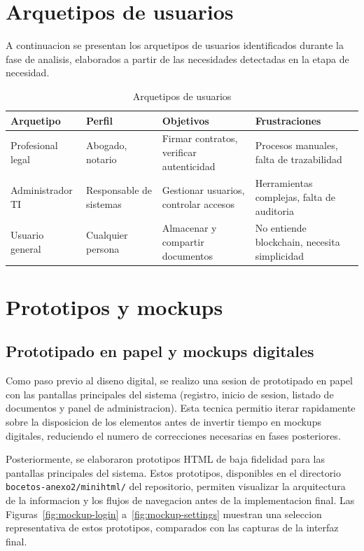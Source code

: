 \documentclass[11pt, a4paper]{article}
\begin{document}
\section{Arquetipos de usuarios}

A continuacion se presentan los arquetipos de usuarios identificados durante la fase de analisis, elaborados a partir de las necesidades detectadas en la etapa de necesidad.

\begin{table}[H]
\centering
\renewcommand{\arraystretch}{1.4}
\small
\begin{tabular}{|l|p{4cm}|p{4cm}|p{4cm}|}
\hline
\textbf{Arquetipo} & \textbf{Perfil} & \textbf{Objetivos} & \textbf{Frustraciones} \\
\hline
Profesional legal & Abogado, notario & Firmar contratos, verificar autenticidad & Procesos manuales, falta de trazabilidad \\
\hline
Administrador TI & Responsable de sistemas & Gestionar usuarios, controlar accesos & Herramientas complejas, falta de auditoria \\
\hline
Usuario general & Cualquier persona & Almacenar y compartir documentos & No entiende blockchain, necesita simplicidad \\
\hline
\end{tabular}
\caption{Arquetipos de usuarios}
\label{tab:arquetipos}
\end{table}

\section{Prototipos y mockups}

\subsection{Prototipado en papel y mockups digitales}

Como paso previo al diseno digital, se realizo una sesion de prototipado en papel con las pantallas principales del sistema (registro, inicio de sesion, listado de documentos y panel de administracion). Esta tecnica permitio iterar rapidamente sobre la disposicion de los elementos antes de invertir tiempo en mockups digitales, reduciendo el numero de correcciones necesarias en fases posteriores.

Posteriormente, se elaboraron prototipos HTML de baja fidelidad para las pantallas principales del sistema. Estos prototipos, disponibles en el directorio \texttt{bocetos-anexo2/minihtml/} del repositorio, permiten visualizar la arquitectura de la informacion y los flujos de navegacion antes de la implementacion final. Las Figuras~\ref{fig:mockup-login} a~\ref{fig:mockup-settings} muestran una seleccion representativa de estos prototipos, comparados con las capturas de la interfaz final.
\end{document}
